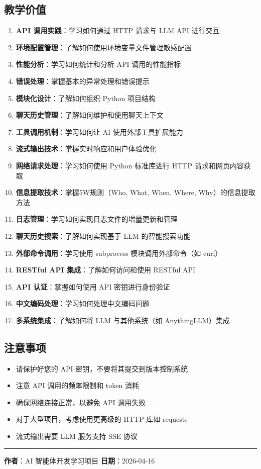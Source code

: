 \documentclass[]{article}
\providecommand{\tightlist}{%
  \setlength{\itemsep}{0pt}\setlength{\parskip}{0pt}}
\begin{document}
\subsection{教学价值}\label{ux6559ux5b66ux4ef7ux503c}

\begin{enumerate}
\def\labelenumi{\arabic{enumi}.}
\tightlist
\item
  \textbf{API 调用实践}：学习如何通过 HTTP 请求与 LLM API 进行交互
\item
  \textbf{环境配置管理}：了解如何使用环境变量文件管理敏感配置
\item
  \textbf{性能分析}：学习如何统计和分析 API 调用的性能指标
\item
  \textbf{错误处理}：掌握基本的异常处理和错误提示
\item
  \textbf{模块化设计}：了解如何组织 Python 项目结构
\item
  \textbf{聊天历史管理}：了解如何维护和使用聊天上下文
\item
  \textbf{工具调用机制}：学习如何让 AI 使用外部工具扩展能力
\item
  \textbf{流式输出技术}：掌握实时响应和用户体验优化
\item
  \textbf{网络请求处理}：学习如何使用 Python 标准库进行 HTTP
  请求和网页内容获取
\item
  \textbf{信息提取技术}：掌握5W规则（Who, What, When, Where,
  Why）的信息提取方法
\item
  \textbf{日志管理}：学习如何实现日志文件的增量更新和管理
\item
  \textbf{聊天历史搜索}：了解如何实现基于 LLM 的智能搜索功能
\item
  \textbf{外部命令调用}：学习使用 subprocess 模块调用外部命令（如 curl）
\item
  \textbf{RESTful API 集成}：了解如何访问和使用 RESTful API
\item
  \textbf{API 认证}：掌握如何使用 API 密钥进行身份验证
\item
  \textbf{中文编码处理}：学习如何处理中文编码问题
\item
  \textbf{多系统集成}：了解如何将 LLM 与其他系统（如 AnythingLLM）集成
\end{enumerate}

\subsection{注意事项}\label{ux6ce8ux610fux4e8bux9879}

\begin{itemize}
\tightlist
\item
  请保护好您的 API 密钥，不要将其提交到版本控制系统
\item
  注意 API 调用的频率限制和 token 消耗
\item
  确保网络连接正常，以避免 API 调用失败
\item
  对于大型项目，考虑使用更高级的 HTTP 库如 requests
\item
  流式输出需要 LLM 服务支持 SSE 协议
\end{itemize}

\begin{center}\rule{0.5\linewidth}{\linethickness}\end{center}

\textbf{作者}：AI 智能体开发学习项目 \textbf{日期}：2026-04-16
\end{document}
